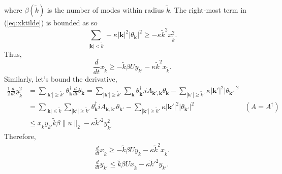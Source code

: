 \documentclass[12pt]{article}
\begin{document}
where $\beta(\tilde{k})$  is the number of modes within radius $\tilde{k}$.
The right-most term in (\ref{eq:xktilde}) is bounded as so
\begin{equation}
\sum_{|\mathbf{k}|<\tilde{k}} - \kappa |\mathbf{k}|^{2}|\theta_{\mathbf{k}}|^{2} \geq -\kappa \tilde{k}^{2} x_{\tilde{k}}^2 .
\end{equation}
Thus, 
\begin{equation}
\frac{d}{dt}x_{\tilde{k}}\geq   - \tilde{k}\beta U y_{\tilde{k}'} -\kappa \tilde{k}^{2} x_{\tilde{k}}.
\end{equation}
Similarly, let's bound the derivative, 
\begin{align}
\label{eq:yktilde}
\frac{1}{2}\frac{d}{dt}y^2_{\tilde{k}}&=\sum_{|\mathbf{k}'|\geq \tilde{k}'}\theta_{\mathbf{k}}^{\dagger}\frac{d}{dt}\theta_{\mathbf{k}}=\sum_{|\mathbf{k}'|\geq \tilde{k}'}\sum_{\mathbf{k}}\theta_{\mathbf{k}'}^{\dagger}iA_{\mathbf{k}',\mathbf{k}}\theta_{\mathbf{k}} - \sum_{|\mathbf{k}'|\geq \tilde{k}'}\kappa |\mathbf{k}'|^{2}|\theta_{\mathbf{k}'}|^{2}\\
&= \sum_{|\mathbf{k}|\leq\tilde{k}}\sum_{|\mathbf{k}'|\geq \tilde{k}'}\theta_{\mathbf{k}}^{\dagger}iA_{\mathbf{k},\mathbf{k'}}\theta_{\mathbf{k}'} -\sum_{|\mathbf{k}'|\geq \tilde{k}'} \kappa |\mathbf{k}'|^{2}|\theta_{\mathbf{k}'}|^{2} &  (A=A^{\dagger})  \\
&\leq x_{\tilde{k}}y_{\tilde{k}'} \tilde{k}\beta \|u\|_{2} - \kappa \tilde{k}'^{2} y_{\tilde{k}'}^2 & 
\end{align}
Therefore,
\begin{subequations}
\label{inequalties}
\begin{align}
\frac{d}{dt}x_{\tilde{k}}\geq   - \tilde{k}\beta U y_{\tilde{k}} -\kappa \tilde{k}^{2} x_{\tilde{k}}. \\
\frac{d}{dt}y_{\tilde{k}'}\leq   \tilde{k}\beta U x_{\tilde{k}}  -\kappa \tilde{k}'^{2} y_{\tilde{k}'}.
\end{align}
\end{subequations}
\end{document}
